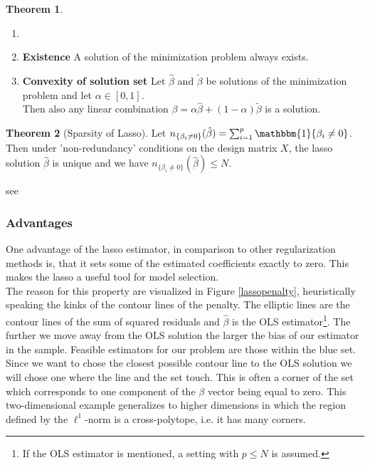 \documentclass{article}
\theoremstyle{definition}
\newtheorem{theorem}{Theorem}
\begin{document}
\begin{theorem}
	\begin{enumerate}
		\item []
		\item \textbf{Existence} A solution of the minimization problem always exists.
		\item \textbf{Convexity of solution set} Let $\hat{\beta}$ and $\tilde{\beta}$ be solutions of the minimization problem and let $\alpha\in[0,1]$.\\
		Then also any linear combination $\beta =\alpha \hat{\beta} + (1-\alpha) \tilde{\beta}$ is a solution. 
	\end{enumerate}
	
\end{theorem}
\begin{theorem}[Sparsity of Lasso] \label{theo: sparsity_lasso}
	Let $n_{\{\beta_i\neq 0\}}(\hat{\beta}) = \sum_{i=1}^{p} \mathbbm{1} \{\beta_i \neq 0\}$.
	Then under 'non-redundancy' conditions on the design matrix $X$, the lasso solution $\hat{\beta}$ is unique and we have $n_{\{\beta_i\neq 0\}}(\hat{\beta}) \leq N$.
\end{theorem}

see \citep{rosset2004boosting}


\subsubsection{Advantages}
One advantage of the lasso estimator, in comparison to other regularization methods is, that it sets some of the estimated coefficients exactly to zero. This makes the lasso a useful tool for model selection. \\
The reason for this property are visualized in Figure \ref{lassopenalty}, heuristically speaking the kinks of the contour lines of the penalty.
The elliptic lines are the contour lines of the sum of squared residuals and  $\hat{\beta}$ is the OLS estimator\footnote{If the OLS estimator is mentioned, a setting with $p\leq N$ is assumed.}. 
The further we move away from the OLS solution the larger the bias of our estimator in the sample.
Feasible estimators for our problem are those within the blue set.
Since we want to chose the closest possible contour line to the OLS solution we will chose one where the line and the set touch.
This is often a corner of the set which corresponds to one component of the $\beta$ vector being equal to zero. This two-dimensional example generalizes to higher dimensions in which the region defined by the $\ell^1$-norm is a cross-polytope, i.e. it has many corners. \newline
\end{document}
